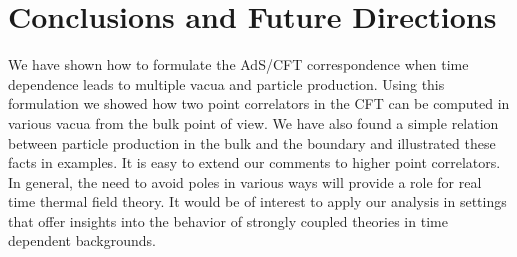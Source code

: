 \documentclass[a4paper,aps,prd,preprintnumbers,groupedaddress]{revtex4}
\begin{document}
\section{Conclusions and Future Directions} \label{conclusions}
We have shown how to formulate the AdS/CFT correspondence when time dependence leads to multiple vacua and particle production. Using this
formulation we showed how two point correlators in the CFT can be computed in various vacua from the bulk point of view. We have also found a
simple relation between particle production in the bulk and the boundary and illustrated these facts in examples.  It is easy to extend our comments to higher point correlators.  In general, the need to avoid poles in various ways will provide a role for real time thermal field theory.   It would be of interest to apply our analysis in settings that offer insights into the behavior of strongly coupled theories in time dependent backgrounds.




\appendix
\end{document}
